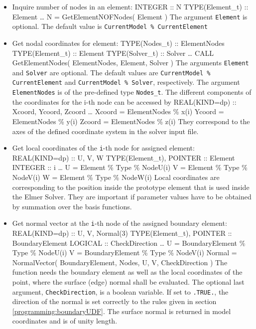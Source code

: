 \begin{itemize}
\item Inquire number of nodes in an element: 
\ttbegin
INTEGER :: N
TYPE(Element_t) :: Element
\ldots
N = GetElementNOFNodes( Element )
\ttend
The argument \texttt{Element} is optional. The default value is \texttt{CurrentModel \% CurrentElement}
\item Get nodal coordinates for element:
\ttbegin
TYPE(Nodes_t) :: ElementNodes
TYPE(Element_t) :: Element
TYPE(Solver_t) :: Solver
\ldots
CALL GetElementNodes( ElementNodes, Element, Solver )
\ttend
The arguments \texttt{Element} and \texttt{Solver} are optional. The default values are \texttt{CurrentModel \% CurrentElement} and \texttt{CurrentModel \% Solver}, respectively. The argument \texttt{ElementNodes} is of the pre-defined type \texttt{Nodes\_t}. The different components of the coordinates for the i-th node can be accessed by
\ttbegin
REAL(KIND=dp) :: Xcoord, Ycoord, Zcoord
\ldots
Xcoord = ElementNodes \% x(i)
Ycoord = ElementNodes \% y(i)
Zcoord = ElementNodes \% z(i)
\ttend
They correspond to the axes of the defined coordinate system in the solver input file.
\item Get local coordinates of the \texttt{i}-th node for assigned element:
\ttbegin
REAL(KIND=dp) :: U, V, W
TYPE(Element_t), POINTER :: Element
INTEGER :: i
\ldots
U = Element \% Type \% NodeU(i)
V = Element \% Type \% NodeV(i)
W = Element \% Type \% NodeW(i)
\ttend
Local coordinates are corresponding to the position inside the prototype element that is used inside the Elmer Solver. They are important if parameter values have to be obtained by summation over the basis functions.
\item Get normal vector at the \texttt{i}-th node of the assigned boundary element: 
\ttbegin
REAL(KIND=dp) :: U, V, Normal(3)
TYPE(Element_t), POINTER :: BoundaryElement
LOGICAL :: CheckDirection
\ldots
U = BoundaryElement \% Type \% NodeU(i)
V = BoundaryElement \% Type \% NodeV(i)
Normal = NormalVector( BoundaryElement, Nodes, U, V, CheckDirection ) 
\ttend
The function needs the boundary element as well as the local coordinates of the point, where the surface (edge) normal shall be evaluated. The optional last argument, \texttt{CheckDirection}, is a boolean variable. If set to \texttt{.TRUE.}, the direction of the normal is set correctly to the rules given in section \ref{programming:boundaryUDF}. The surface normal is returned in model coordinates and is of unity length.
\end{itemize}
